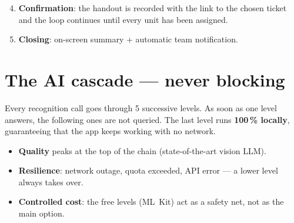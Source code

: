 \documentclass[11pt,a4paper]{article}
\begin{document}
\begin{enumerate}\setcounter{enumi}{3}
  \item \textbf{Confirmation}: the handout is recorded with the link
        to the chosen ticket and the loop continues until every unit
        has been assigned.
  \item \textbf{Closing}: on-screen summary + automatic team
        notification.
\end{enumerate}

\section{The AI cascade — never blocking}

Every recognition call goes through 5 successive levels. As soon as
one level answers, the following ones are not queried. The last
level runs \textbf{100\,\% locally}, guaranteeing that the app keeps
working with no network.

\begin{center}
\end{center}

\begin{ideabox}
\begin{itemize}
  \item \textbf{Quality} peaks at the top of the chain (state-of-the-art
        vision LLM).
  \item \textbf{Resilience}: network outage, quota exceeded, API error —
        a lower level always takes over.
  \item \textbf{Controlled cost}: the free levels (ML~Kit) act as a
        safety net, not as the main option.
\end{itemize}
\end{ideabox}

\end{document}
